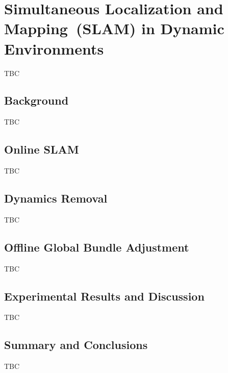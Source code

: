 \chapter{Simultaneous Localization and Mapping~(SLAM) in Dynamic Environments}\label{chap:slam}

TBC

\section{Background}\label{sec:slam:background}

TBC

\section{Online SLAM}\label{sec:slam:online}

TBC

\section{Dynamics Removal}\label{sec:slam:dynamics}

TBC

\section{Offline Global Bundle Adjustment}\label{sec:slam:offline}

TBC

\section{Experimental Results and Discussion}\label{sec:slam:results}

TBC

\section{Summary and Conclusions}\label{sec:slam:conclusions}

TBC
